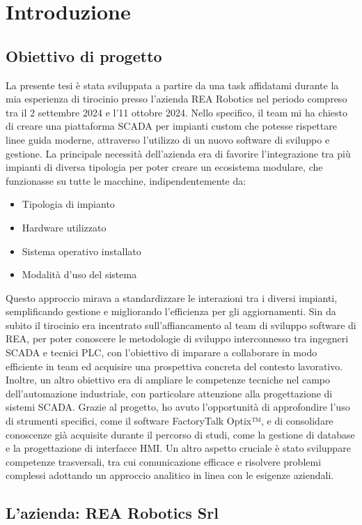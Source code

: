 \chapter{Introduzione}

\section{Obiettivo di progetto} 
La presente tesi è stata sviluppata a partire da una task affidatami durante la mia esperienza di tirocinio presso l'azienda REA Robotics nel periodo compreso tra il 2 settembre 2024 e l'11 ottobre 2024. Nello specifico, il team mi ha chiesto di creare una piattaforma SCADA per impianti custom che potesse rispettare linee guida moderne, attraverso l'utilizzo di un nuovo software di sviluppo e gestione. La principale necessità dell'azienda era di favorire l'integrazione tra più impianti di diversa tipologia per poter creare un ecosistema modulare, che funzionasse su tutte le macchine, indipendentemente da:
\begin{itemize}
    \item Tipologia di impianto
    \item Hardware utilizzato
    \item Sistema operativo installato
    \item Modalità d'uso del sistema
\end{itemize}
Questo approccio mirava a standardizzare le interazioni tra i diversi impianti, semplificando gestione e migliorando l'efficienza per gli aggiornamenti. Sin da subito il tirocinio era incentrato sull'affiancamento al team di sviluppo software di REA, per poter conoscere le metodologie di sviluppo interconnesso tra ingegneri SCADA e tecnici PLC, con l'obiettivo di imparare a collaborare in modo efficiente in team ed acquisire una prospettiva concreta del contesto lavorativo. Inoltre, un altro obiettivo era di ampliare le competenze tecniche nel campo dell'automazione industriale, con particolare attenzione alla progettazione di sistemi SCADA. Grazie al progetto, ho avuto l'opportunità di approfondire l'uso di strumenti specifici, come il software FactoryTalk Optix™, e di consolidare conoscenze già acquisite durante il percorso di studi, come la gestione di database e la progettazione di interfacce HMI. Un altro aspetto cruciale è stato sviluppare competenze trasversali, tra cui comunicazione efficace e risolvere problemi complessi adottando un approccio analitico in linea con le esigenze aziendali.

\section{L'azienda: REA Robotics Srl}

